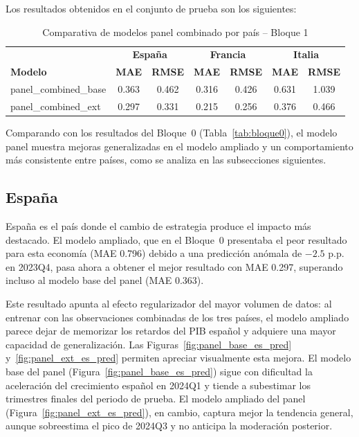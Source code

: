 Los resultados obtenidos en el conjunto de prueba son los siguientes:

\begin{table}[H]
\centering
\caption{Comparativa de modelos panel combinado por país -- Bloque 1}
\label{tab:bloque1}
\small
\begin{tabular}{lcccccc}
\hline
 & \multicolumn{2}{c}{\textbf{España}} & \multicolumn{2}{c}{\textbf{Francia}} & \multicolumn{2}{c}{\textbf{Italia}} \\
\textbf{Modelo} & \textbf{MAE} & \textbf{RMSE} & \textbf{MAE} & \textbf{RMSE} & \textbf{MAE} & \textbf{RMSE} \\
\hline
panel\_combined\_base & 0.363 & 0.462 & 0.316 & 0.426 & 0.631 & 1.039 \\
panel\_combined\_ext  & 0.297 & 0.331 & 0.215 & 0.256 & 0.376 & 0.466 \\
\hline
\end{tabular}
\end{table}

Comparando con los resultados del Bloque~0 (Tabla~\ref{tab:bloque0}), el modelo panel muestra mejoras generalizadas en el modelo ampliado y un comportamiento más consistente entre países, como se analiza en las subsecciones siguientes.

\FloatBarrier
\subsection{España}

España es el país donde el cambio de estrategia produce el impacto más destacado. El modelo ampliado, que en el Bloque~0 presentaba el peor resultado para esta economía (MAE 0.796) debido a una predicción anómala de $-2.5$ p.p. en 2023Q4, pasa ahora a obtener el mejor resultado con MAE 0.297, superando incluso al modelo base del panel (MAE 0.363).

Este resultado apunta al efecto regularizador del mayor volumen de datos: al entrenar con las observaciones combinadas de los tres países, el modelo ampliado parece dejar de memorizar los retardos del PIB español y adquiere una mayor capacidad de generalización. Las Figuras~\ref{fig:panel_base_es_pred} y~\ref{fig:panel_ext_es_pred} permiten apreciar visualmente esta mejora. El modelo base del panel (Figura~\ref{fig:panel_base_es_pred}) sigue con dificultad la aceleración del crecimiento español en 2024Q1 y tiende a subestimar los trimestres finales del periodo de prueba. El modelo ampliado del panel (Figura~\ref{fig:panel_ext_es_pred}), en cambio, captura mejor la tendencia general, aunque sobreestima el pico de 2024Q3 y no anticipa la moderación posterior.

